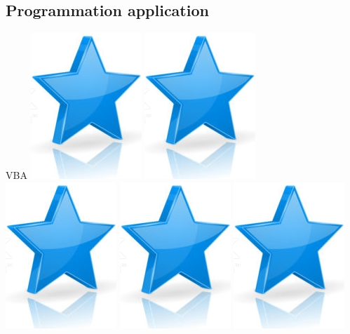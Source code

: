 \documentclass[10pt,a4paper,sans]{article}
\begin{document}
\begin{minipage}{0.23\textwidth}
    \subsection{Programmation application}
    VBA
    \includegraphics[scale=0.25]{img/star.png}
    \includegraphics[scale=0.25]{img/star.png}
    \includegraphics[scale=0.25]{img/star.png}
    \includegraphics[scale=0.25]{img/star.png}
    \includegraphics[scale=0.25]{img/star.png}

\end{minipage}
\end{document}
